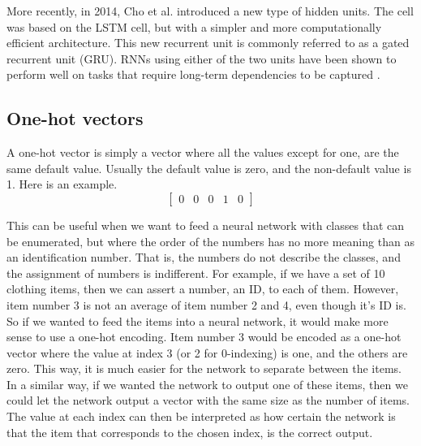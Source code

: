 More recently, in 2014, Cho et al. \cite{DBLP:journals/corr/ChoMGBSB14} introduced a new type of hidden units. The cell was based on the LSTM cell, but with a simpler and more computationally efficient architecture. This new recurrent unit is commonly referred to as a gated recurrent unit (GRU). RNNs using either of the two units have been shown to perform well on tasks that require long-term dependencies to be captured \cite{DBLP:journals/corr/ChungGCB14}.

\subsection{One-hot vectors}
A one-hot vector is simply a vector where all the values except for one, are the same default value. Usually the default value is zero, and the non-default value is 1. Here is an example.
\[
\begin{bmatrix}
0 & 0 & 0 & 1 & 0
\end{bmatrix}
\]

This can be useful when we want to feed a neural network with classes that can be enumerated, but where the order of the numbers has no more meaning than as an identification number. That is, the numbers do not describe the classes, and the assignment of numbers is indifferent. For example, if we have a set of 10 clothing items, then we can assert a number, an ID, to each of them. However, item number 3 is not an average of item number 2 and 4, even though it's ID is. So if we wanted to feed the items into a neural network, it would make more sense to use a one-hot encoding. Item number 3 would be encoded as a one-hot vector where the value at index 3 (or 2 for 0-indexing) is one, and the others are zero. This way, it is much easier for the network to separate between the items. In a similar way, if we wanted the network to output one of these items, then we could let the network output a vector with the same size as the number of items. The value at each index can then be interpreted as how certain the network is that the item that corresponds to the chosen index, is the correct output. 

